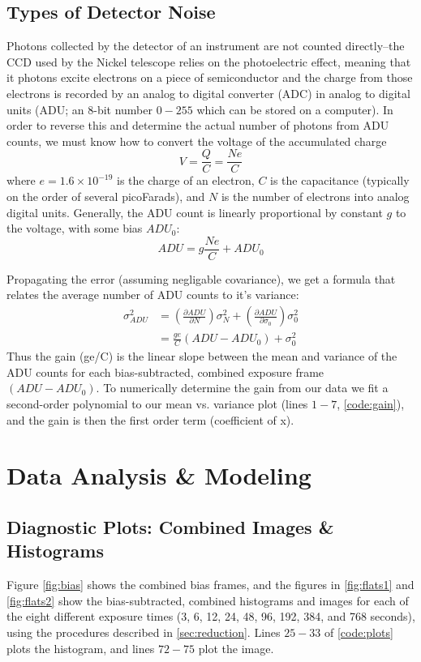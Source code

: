 \documentclass[preprint]{aastex62}
\begin{document}
\subsection{Types of Detector Noise} \label{subsec:noise}
Photons collected by the detector of an instrument are not counted directly--the CCD used by the Nickel telescope relies on the photoelectric effect, meaning that it photons excite electrons on a piece of semiconductor and the charge from those electrons is recorded by an analog to digital converter (ADC) in analog to digital units (ADU; an 8-bit number $0-255$ which can be stored on a computer). In order to reverse this and determine the actual number of photons from ADU counts, we must know how to convert the voltage of the accumulated charge 
\begin{equation}
V = \frac{Q}{C} = \frac{Ne}{C}
\end{equation}
where $e=1.6\times10^{-19}$ is the charge of an electron, $C$ is the capacitance (typically on the order of several picoFarads), and $N$ is the number of electrons into analog digital units. Generally, the ADU count is linearly proportional by constant $g$ to the voltage, with some bias $ADU_0$:
\begin{equation}
ADU = g\frac{Ne}{C} + ADU_0
\end{equation}

Propagating the error (assuming negligable covariance), we get a formula that relates the average number of ADU counts to it's variance:
\begin{align}
\sigma_{ADU}^2 &= \left(\frac{\partial ADU}{\partial N} \right) \sigma_N^2 + 
    \left(\frac{\partial ADU}{\partial \sigma_0} \right) \sigma_0^2 \\
    &= \frac{ge}{C} \left(ADU - ADU_0 \right) + \sigma_0^2
\end{align}
Thus the gain (ge/C) is the linear slope between the mean and variance of the ADU counts for each bias-subtracted, combined exposure frame $\left(ADU - ADU_0 \right)$. To numerically determine the gain from our data we fit a second-order polynomial to our mean vs. variance plot (lines $1-7$, \ref{code:gain}), and the gain is then the first order term (coefficient of x).

\section{Data Analysis \& Modeling}

\subsection{Diagnostic Plots: Combined Images \& Histograms} \label{subsec:diagnostic}
Figure \ref{fig:bias} shows the combined bias frames, and the figures in \ref{fig:flats1} and \ref{fig:flats2} show the bias-subtracted, combined histograms and images for each of the eight different exposure times (3, 6, 12, 24, 48, 96, 192, 384, and 768 seconds), using the procedures described in \ref{sec:reduction}. Lines $25-33$ of \ref{code:plots} plots the histogram, and lines $72-75$ plot the image.
\end{document}

